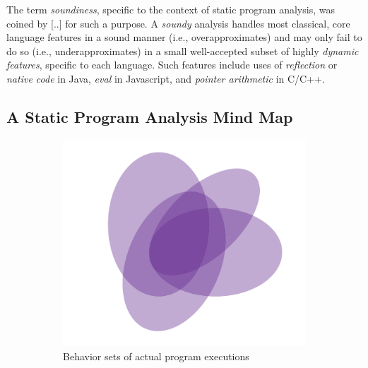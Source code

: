 The term \emph{soundiness}, specific to the context of static program analysis,
was coined by [..] for such a purpose. A \emph{soundy} analysis handles most
classical, core language features in a sound manner (i.e., overapproximates)
and may only fail to do so (i.e., underapproximates) in a small well-accepted
subset of highly \emph{dynamic features}, specific to each language. Such
features include uses of \emph{reflection} or \emph{native code} in Java,
\emph{eval} in Javascript, and \emph{pointer arithmetic} in C/C++.

\subsection{A Static Program Analysis Mind Map}

\begin{figure}[htb!]
\begin{subfigure}{.47\textwidth}
    \includegraphics[scale=.45]{assets/intro/venn-soundness-a.pdf}
    \caption{Behavior sets of actual program executions}
    \label{fig:soundness-a}
\end{subfigure}
\hfill
\begin{subfigure}{.47\textwidth}

\end{subfigure}
\end{figure}
